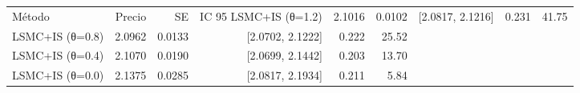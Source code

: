 \begin{tabular}{p{3.3cm}rrrrr}
\toprule
Método & Precio & SE & IC 95%
\midrule
LSMC+IS (θ=1.2) & 2.1016 & 0.0102 & [2.0817, 2.1216] & 0.231 & 41.75 \\
LSMC+IS (θ=0.8) & 2.0962 & 0.0133 & [2.0702, 2.1222] & 0.222 & 25.52 \\
LSMC+IS (θ=0.4) & 2.1070 & 0.0190 & [2.0699, 2.1442] & 0.203 & 13.70 \\
LSMC+IS (θ=0.0) & 2.1375 & 0.0285 & [2.0817, 2.1934] & 0.211 & 5.84 \\
\bottomrule
\end{tabular}
